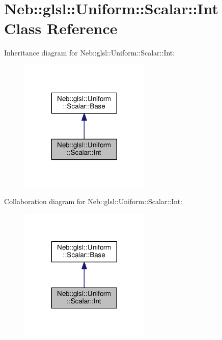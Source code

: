 \hypertarget{classNeb_1_1glsl_1_1Uniform_1_1Scalar_1_1Int}{\section{Neb\-:\-:glsl\-:\-:Uniform\-:\-:Scalar\-:\-:Int Class Reference}
\label{classNeb_1_1glsl_1_1Uniform_1_1Scalar_1_1Int}
}


Inheritance diagram for Neb\-:\-:glsl\-:\-:Uniform\-:\-:Scalar\-:\-:Int\-:
\nopagebreak
\begin{figure}[H]
\begin{center}
\leavevmode
\includegraphics[width=176pt]{classNeb_1_1glsl_1_1Uniform_1_1Scalar_1_1Int__inherit__graph}
\end{center}
\end{figure}


Collaboration diagram for Neb\-:\-:glsl\-:\-:Uniform\-:\-:Scalar\-:\-:Int\-:
\nopagebreak
\begin{figure}[H]
\begin{center}
\leavevmode
\includegraphics[width=176pt]{classNeb_1_1glsl_1_1Uniform_1_1Scalar_1_1Int__coll__graph}
\end{center}
\end{figure}

